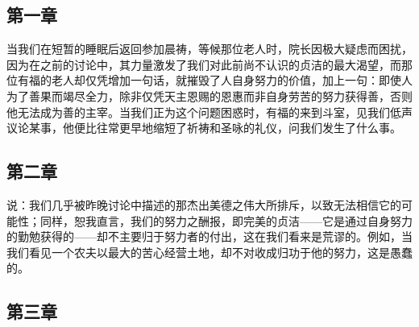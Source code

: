 
\subsection{第一章}

\par

当我们在短暂的睡眠后返回参加晨祷，等候那位老人时，院长因极大疑虑而困扰，因为在之前的讨论中，其力量激发了我们对此前尚不认识的贞洁的最大渴望，而那位有福的老人却仅凭增加一句话，就摧毁了人自身努力的价值，加上一句：即使人为了善果而竭尽全力，除非仅凭天主恩赐的恩惠而非自身劳苦的努力获得善，否则他无法成为善的主宰。当我们正为这个问题困惑时，有福的来到斗室，见我们低声议论某事，他便比往常更早地缩短了祈祷和圣咏的礼仪，问我们发生了什么事。\par


\subsection{第二章}

\par

说：我们几乎被昨晚讨论中描述的那杰出美德之伟大所排斥，以致无法相信它的可能性；同样，恕我直言，我们的努力之酬报，即完美的贞洁——它是通过自身努力的勤勉获得的——却不主要归于努力者的付出，这在我们看来是荒谬的。例如，当我们看见一个农夫以最大的苦心经营土地，却不对收成归功于他的努力，这是愚蠢的。\par


\subsection{第三章}

\par

